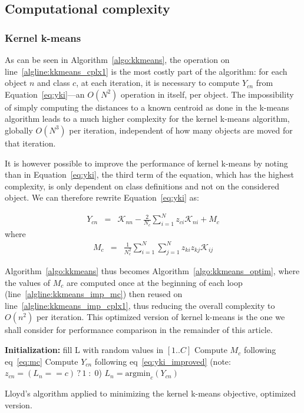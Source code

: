 \documentclass[twoside,11pt]{article}
\newcommand{\cad}{---} %
\begin{document}
\subsection{Computational complexity}

\subsubsection{Kernel k-means}

As can be seen in Algorithm~\ref{algo:kkmeans}, the operation on line~\ref{algline:kkmeans_cplx1} is the most costly part of the algorithm: for each object $n$ and class $c$, at each iteration, it is necessary to compute $Y_{cn}$ from Equation~\ref{eq:yki}\cad{}an $O(N^2)$ operation in itself, per object. The impossibility of simply computing the distances to a known centroid as done in the k-means algorithm leads to a much higher complexity for the kernel k-means algorithm, globally $O(N^3)$ per iteration, independent of how many objects are moved for that iteration.

It is however possible to improve the performance of kernel k-means by noting than in Equation~\ref{eq:yki}, the third term of the equation, which has the highest complexity, is only dependent on class definitions and not on the considered object. We can therefore rewrite Equation~\ref{eq:yki} as:

\begin{eqnarray}
Y_{cn} & = & \mathcal{K}_{nn} - \frac{2}{N_c} \sum_{i=1}^{N} z_{ci} \mathcal{K}_{ni} + M_c \label{eq:yki_improved}
\end{eqnarray}
where
\begin{eqnarray}
M_c    & = & \frac{1}{N_c^2} \sum_{i=1}^{N} \sum_{j=1}^{N} z_{ki} z_{kj} \mathcal{K}_{ij} \label{eq:mc}
\end{eqnarray}

Algorithm~\ref{algo:kkmeans} thus becomes Algorithm~\ref{algo:kkmeans_optim}, where the values of $M_c$ are computed once at the beginning of each loop (line~\ref{algline:kkmeans_imp_mc}) then reused on line~\ref{algline:kkmeans_imp_cplx1}, thus reducing the overall complexity to $O(n^2)$ per iteration. This optimized version of kernel k-means is the one we shall consider for performance comparison in the remainder of this article.

\begin{algorithm}
	\label{algo:kkmeans_optim}
	\SetAlgoLined
	\BlankLine	
	\textbf{Initialization:}
	fill L with random values in $[1..C]$\;
	\BlankLine	
	 {
	     {
	        Compute $M_c$ following eq~\ref{eq:mc} \label{algline:kkmeans_imp_mc}
	    }
		 {
			 {
				Compute $Y_{cn}$ following eq~\ref{eq:yki_improved} \label{algline:kkmeans_imp_cplx1}
				(note: $z_{cn} = (L_n == c)\,?\,1\;:\;0$)
			}
			$L_n = \textrm{argmin}_c (Y_{cn})$\;
		}
	}
	\BlankLine
	\caption{Lloyd's algorithm applied to minimizing the kernel k-means objective, optimized version.}
\end{algorithm}
\end{document}

